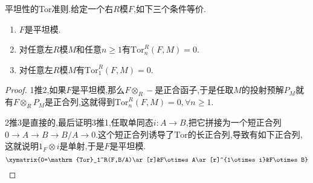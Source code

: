 平坦性的Tor准则.给定一个右$R$模$F$,如下三个条件等价.
\begin{enumerate}
	\item $F$是平坦模.
	\item 对任意左$R$模$M$和任意$n\ge1$有$\mathrm{Tor}_n^R(F,M)=0$.
	\item 对任意左$R$模$M$有$\mathrm{Tor}_1^R(F,M)=0$.
\end{enumerate}
\begin{proof}
	
	1推2,如果$F$是平坦模,那么$F\otimes_R-$是正合函子,于是任取$M$的投射预解$P_M$就有$F\otimes_RP_M$是正合列,这就得到$\mathrm{Tor}_n^R(F,M)=0,\forall n\ge1$.
	
	2推3是直接的,最后证明3推1,任取单同态$i:A\to B$,把它拼接为一个短正合列$0\to A\to B\to B/A\to0$.这个短正合列诱导了$\mathrm{Tor}$的长正合列,导致有如下正合列,这就说明$1_F\otimes i$是单射,于是$F$是平坦模.
	$$\xymatrix{0=\mathrm{Tor}_1^R(F,B/A)\ar[r]&F\otimes A\ar[r]^{1\otimes i}&F\otimes B}$$
\end{proof}

